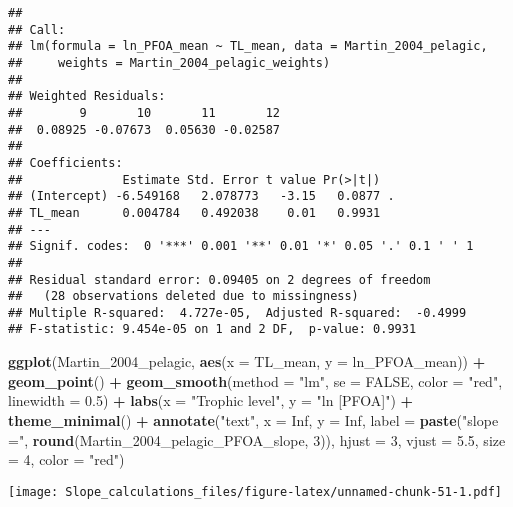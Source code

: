 \documentclass[
]{article}
\newenvironment{Shaded}{\begin{snugshade}}{\end{snugshade}}
\newcommand{\AttributeTok}[1]{\textcolor[rgb]{0.13,0.29,0.53}{#1}}
\newcommand{\ConstantTok}[1]{\textcolor[rgb]{0.56,0.35,0.01}{#1}}
\newcommand{\DecValTok}[1]{\textcolor[rgb]{0.00,0.00,0.81}{#1}}
\newcommand{\FloatTok}[1]{\textcolor[rgb]{0.00,0.00,0.81}{#1}}
\newcommand{\FunctionTok}[1]{\textcolor[rgb]{0.13,0.29,0.53}{\textbf{#1}}}
\newcommand{\NormalTok}[1]{#1}
\newcommand{\SpecialCharTok}[1]{\textcolor[rgb]{0.81,0.36,0.00}{\textbf{#1}}}
\newcommand{\StringTok}[1]{\textcolor[rgb]{0.31,0.60,0.02}{#1}}
\begin{document}
\begin{verbatim}
## 
## Call:
## lm(formula = ln_PFOA_mean ~ TL_mean, data = Martin_2004_pelagic, 
##     weights = Martin_2004_pelagic_weights)
## 
## Weighted Residuals:
##        9       10       11       12 
##  0.08925 -0.07673  0.05630 -0.02587 
## 
## Coefficients:
##              Estimate Std. Error t value Pr(>|t|)  
## (Intercept) -6.549168   2.078773   -3.15   0.0877 .
## TL_mean      0.004784   0.492038    0.01   0.9931  
## ---
## Signif. codes:  0 '***' 0.001 '**' 0.01 '*' 0.05 '.' 0.1 ' ' 1
## 
## Residual standard error: 0.09405 on 2 degrees of freedom
##   (28 observations deleted due to missingness)
## Multiple R-squared:  4.727e-05,  Adjusted R-squared:  -0.4999 
## F-statistic: 9.454e-05 on 1 and 2 DF,  p-value: 0.9931
\end{verbatim}

\begin{Shaded}
\begin{Highlighting}[]
\FunctionTok{ggplot}\NormalTok{(Martin\_2004\_pelagic, }\FunctionTok{aes}\NormalTok{(}\AttributeTok{x =}\NormalTok{ TL\_mean, }\AttributeTok{y =}\NormalTok{ ln\_PFOA\_mean)) }\SpecialCharTok{+}
  \FunctionTok{geom\_point}\NormalTok{() }\SpecialCharTok{+}
  \FunctionTok{geom\_smooth}\NormalTok{(}\AttributeTok{method =} \StringTok{"lm"}\NormalTok{, }\AttributeTok{se =} \ConstantTok{FALSE}\NormalTok{, }\AttributeTok{color =} \StringTok{"red"}\NormalTok{, }\AttributeTok{linewidth =} \FloatTok{0.5}\NormalTok{) }\SpecialCharTok{+}
  \FunctionTok{labs}\NormalTok{(}\AttributeTok{x =} \StringTok{"Trophic level"}\NormalTok{,}
       \AttributeTok{y =} \StringTok{"ln [PFOA]"}\NormalTok{) }\SpecialCharTok{+}
  \FunctionTok{theme\_minimal}\NormalTok{() }\SpecialCharTok{+}
  \FunctionTok{annotate}\NormalTok{(}\StringTok{"text"}\NormalTok{, }\AttributeTok{x =} \ConstantTok{Inf}\NormalTok{, }\AttributeTok{y =} \ConstantTok{Inf}\NormalTok{, }\AttributeTok{label =} \FunctionTok{paste}\NormalTok{(}\StringTok{"slope ="}\NormalTok{, }\FunctionTok{round}\NormalTok{(Martin\_2004\_pelagic\_PFOA\_slope, }\DecValTok{3}\NormalTok{)), }
           \AttributeTok{hjust =} \DecValTok{3}\NormalTok{, }\AttributeTok{vjust =} \FloatTok{5.5}\NormalTok{, }\AttributeTok{size =} \DecValTok{4}\NormalTok{, }\AttributeTok{color =} \StringTok{"red"}\NormalTok{)}
\end{Highlighting}
\end{Shaded}

\texttt{[image: Slope\_calculations\_files/figure-latex/unnamed-chunk-51-1.pdf]}
\end{document}
